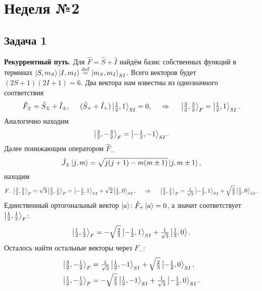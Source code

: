 \section{Неделя №2}

\subsection*{Задача 1}

\textbf{Рекуррентный путь}. 
Для $\hat{F} = \hat{S} + \hat{I}$ найдём базис собственных функций в терминах 
$\left| S, m_S \right\rangle\left| I, m_I \right\rangle \overset{\mathrm{def}}{=} \left| m_S, m_I \right\rangle_{SI}$.
Всего векторов будет $(2 S + 1)(2 I + 1) = 6$. 
 Два вектора нам известны из однозначного соответствия
\begin{equation*}
    \hat{F}_\pm = \hat{S}_\pm + \hat{I}_\pm, 
    \hspace{5 mm} 
    (\hat{S}_+ + \hat{I}_+) \left| \tfrac{1}{2}, 1 \right\rangle_{SI} = 0,
    \hspace{0.5cm} \Rightarrow \hspace{0.5cm}
    \left| \tfrac{3}{2}, \tfrac{3}{2} \right\rangle_F = \left| \tfrac{1}{2}, 1 \right\rangle_{SI}.
\end{equation*}
Аналогично находим
\begin{equation*}
    \left| \tfrac{3}{2}, -\tfrac{3}{2} \right\rangle_F = \left| -\tfrac{1}{2}, -1 \right\rangle_{SI}.
\end{equation*}
Далее понижающим оператором $\hat{F}_-$ 
\begin{equation*}
    \hat{J}_\pm \left| j,m \right\rangle = \sqrt{j (j + 1) - m (m \pm 1)} \left| j, m\pm 1 \right\rangle,
\end{equation*}
находим
\begin{equation*}
    F_- \left| \tfrac{3}{2}, \tfrac{3}{2} \right\rangle_F = \sqrt{3} \left| \tfrac{3}{2}, \tfrac{1}{2} \right\rangle_F = \left| -\tfrac{1}{2},1 \right\rangle_{SI} + \sqrt{2} \left| \tfrac{1}{2},0 \right\rangle_{SI},
    \hspace{0.5cm} \Rightarrow \hspace{0.5cm}
    \left| \tfrac{3}{2},\tfrac{1}{2} \right\rangle_F = \tfrac{1}{\sqrt{3}} \left| - \tfrac{1}{2}, 1 \right\rangle_{SI} + \sqrt{\tfrac{2}{3}} \left| \tfrac{1}{2},0 \right\rangle_{SI}.
\end{equation*}
Единственный ортогональный вектор $\left| a \right\rangle$: $\hat{F}_+ \left| a \right\rangle = 0$, а значит соответствует $\left| \tfrac{1}{2}, \tfrac{1}{2} \right\rangle_F$:
\begin{equation*}
    \left| \tfrac{1}{2}, \tfrac{1}{2} \right\rangle_F = - \sqrt{\tfrac{2}{3}}\left| -\tfrac{1}{2}, 1 \right\rangle_{SI} + \tfrac{1}{\sqrt{3}} \left| \tfrac{1}{2},0 \right\rangle.
\end{equation*}
Осталось найти остальные векторы через $F_-$:
\begin{align*}
    \left| \tfrac{3}{2}, -\tfrac{1}{2} \right\rangle_F &= \tfrac{1}{\sqrt{3}} \left| \tfrac{1}{2},-1 \right\rangle_{SI} + \sqrt{\tfrac{2}{3}} \left| -\tfrac{1}{2}, 0 \right\rangle_{SI}, \\
    \left| \tfrac{1}{2}, -\tfrac{1}{2} \right\rangle_F &= -\sqrt{\tfrac{2}{3}} \left| \tfrac{1}{2}, -1 \right\rangle_{SI} + \tfrac{1}{\sqrt{3}}\left| -\tfrac{1}{2},0 \right\rangle_{SI}.
\end{align*}

